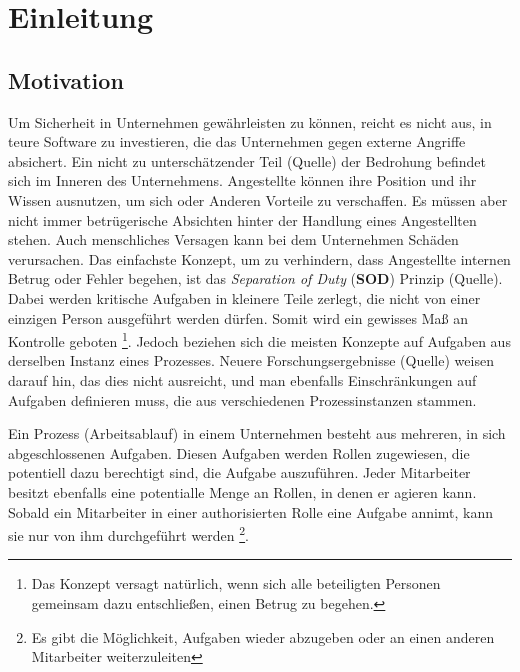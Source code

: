 
\chapter{Einleitung} %

\label{Chapter1} %



\section{Motivation}

Um Sicherheit in Unternehmen gewährleisten zu können, reicht es nicht aus, in teure Software zu investieren, die das Unternehmen gegen externe Angriffe absichert. Ein nicht zu unterschätzender Teil (Quelle) der Bedrohung befindet sich im Inneren des Unternehmens. Angestellte können ihre Position und ihr Wissen ausnutzen, um sich oder Anderen Vorteile zu verschaffen. Es müssen aber nicht immer betrügerische Absichten hinter der Handlung eines Angestellten stehen. Auch menschliches Versagen kann bei dem Unternehmen Schäden verursachen. Das einfachste Konzept, um zu verhindern, dass Angestellte internen Betrug oder Fehler begehen, ist das \textit{Separation of Duty} (\textbf{SOD}) Prinzip (Quelle). Dabei werden kritische Aufgaben in kleinere Teile zerlegt, die nicht von einer einzigen Person ausgeführt werden dürfen. Somit wird ein gewisses Maß an Kontrolle geboten \footnote{Das Konzept versagt natürlich, wenn sich alle beteiligten Personen gemeinsam dazu entschließen, einen Betrug zu begehen.}. Jedoch beziehen sich die meisten Konzepte auf Aufgaben aus derselben Instanz eines Prozesses. Neuere Forschungsergebnisse (Quelle) weisen darauf hin, das dies nicht ausreicht, und man ebenfalls Einschränkungen auf Aufgaben definieren muss, die aus verschiedenen Prozessinstanzen stammen.

Ein Prozess (Arbeitsablauf) in einem Unternehmen besteht aus mehreren, in sich abgeschlossenen Aufgaben. Diesen Aufgaben werden Rollen zugewiesen, die potentiell dazu berechtigt sind, die Aufgabe auszuführen. Jeder Mitarbeiter besitzt ebenfalls eine potentialle Menge an Rollen, in denen er agieren kann. Sobald ein Mitarbeiter in einer authorisierten Rolle eine Aufgabe annimt, kann sie nur von ihm durchgeführt werden \footnote{Es gibt die Möglichkeit, Aufgaben wieder abzugeben oder an einen anderen Mitarbeiter weiterzuleiten}.

